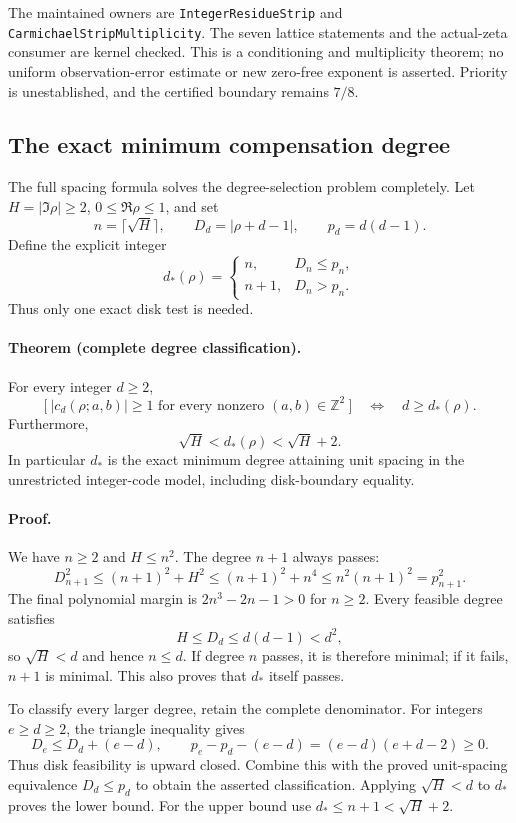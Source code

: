 The maintained owners are \texttt{IntegerResidueStrip} and
\texttt{CarmichaelStripMultiplicity}. The seven lattice statements
and the actual-zeta consumer are kernel checked. This is a conditioning
and multiplicity theorem; no uniform observation-error estimate or new
zero-free exponent is asserted. Priority is unestablished, and the
certified boundary remains \(7/8\).

\subsection{The exact minimum compensation degree}
\label{sec:optimal-residue-degree}

The full spacing formula solves the degree-selection problem completely.
Let \(H=|\Im\rho|\ge2\), \(0\le\Re\rho\le1\), and set
\[
 n=\lceil\sqrt H\rceil,\qquad
 D_d=|\rho+d-1|,\qquad p_d=d(d-1).
\]
Define the explicit integer
\[
 d_*(\rho)=
 \begin{cases}
 n,&D_n\le p_n,\\
 n+1,&D_n>p_n.
 \end{cases}
\]
Thus only one exact disk test is needed.

\paragraph{Theorem (complete degree classification).}
For every integer \(d\ge2\),
\[
 \bigl[\ |c_d(\rho;a,b)|\ge1\text{ for every nonzero }(a,b)\in\mathbb Z^2\ \bigr]
 \quad\Longleftrightarrow\quad d\ge d_*(\rho).
\]
Furthermore,
\[
 \sqrt H<d_*(\rho)<\sqrt H+2.
\]
In particular \(d_*\) is the exact minimum degree attaining unit spacing
in the unrestricted integer-code model, including disk-boundary equality.

\paragraph{Proof.}
We have \(n\ge2\) and \(H\le n^2\). The degree \(n+1\) always passes:
\[
 D_{n+1}^2\le(n+1)^2+H^2
 \le(n+1)^2+n^4\le n^2(n+1)^2=p_{n+1}^2.
\]
The final polynomial margin is \(2n^3-2n-1>0\) for \(n\ge2\).
Every feasible degree satisfies
\[
 H\le D_d\le d(d-1)<d^2,
\]
so \(\sqrt H<d\) and hence \(n\le d\).
If degree \(n\) passes, it is therefore minimal; if it fails,
\(n+1\) is minimal. This also proves that \(d_*\) itself passes.

To classify every larger degree, retain the complete denominator.
For integers \(e\ge d\ge2\), the triangle inequality gives
\[
 D_e\le D_d+(e-d),\qquad
 p_e-p_d-(e-d)=(e-d)(e+d-2)\ge0.
\]
Thus disk feasibility is upward closed. Combine this with the proved
unit-spacing equivalence \(D_d\le p_d\) to obtain the asserted
classification. Applying \(\sqrt H<d\) to \(d_*\) proves the lower
bound. For the upper bound use
\(d_*\le n+1<\sqrt H+2\).

